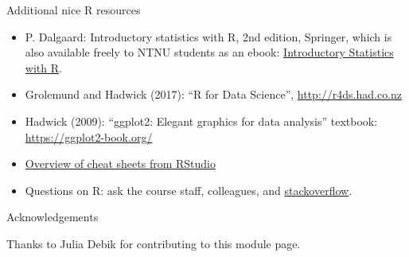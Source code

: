 \documentclass[10pt,ignorenonframetext,]{beamer}
\providecommand{\tightlist}{%
  \setlength{\itemsep}{0pt}\setlength{\parskip}{0pt}}
\begin{document}
\begin{frame}

\begin{block}{Additional nice R resources}

\vspace{3mm}

\begin{itemize}
\tightlist
\item
  P. Dalgaard: Introductory statistics with R, 2nd edition, Springer,
  which is also available freely to NTNU students as an ebook:
  \href{https://link.springer.com/book/10.1007/978-0-387-79054-1}{Introductory
  Statistics with R}.
\end{itemize}

\vspace{1mm}

\begin{itemize}
\tightlist
\item
  Grolemund and Hadwick (2017): ``R for Data Science'',
  \url{http://r4ds.had.co.nz}
\end{itemize}

\vspace{1mm}

\begin{itemize}
\tightlist
\item
  Hadwick (2009): ``ggplot2: Elegant graphics for data analysis''
  textbook: \url{https://ggplot2-book.org/}
\end{itemize}

\vspace{1mm}

\begin{itemize}
\tightlist
\item
  \href{https://www.rstudio.com/resources/cheatsheets/}{Overview of
  cheat sheets from RStudio}
\end{itemize}

\begin{itemize}
\tightlist
\item
  Questions on R: ask the course staff, colleagues, and
  \href{https://stackoverflow.com/}{stackoverflow}.
\end{itemize}

\end{block}

\end{frame}

\begin{frame}{Acknowledgements}
\protect\hypertarget{acknowledgements-1}{}

Thanks to Julia Debik for contributing to this module page.

\end{frame}
\end{document}

